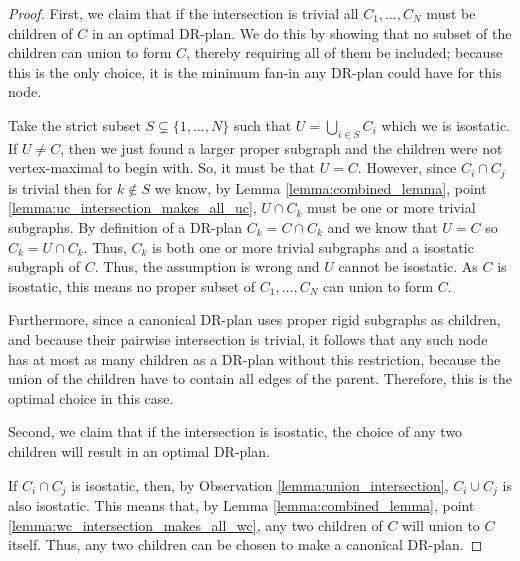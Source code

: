 \begin{proof}
\medskip\noindent
{}
%
First, we claim that if the intersection is trivial all $C_1,\ldots,C_N$ must be children of $C$ in an optimal DR-plan. We do this by showing that no subset of the children can union to form $C$, thereby requiring all of them be included; because this is the only choice, it is the minimum fan-in any DR-plan could have for this node.

Take the strict subset $S\subsetneq \{1,\ldots,N\}$ such that $U=\bigcup_{i\in S}{C_i}$ which we  is isostatic. If $U\neq C$, then we just found a larger proper subgraph and the children were not vertex-maximal to begin with. So, it must be that $U=C$.
\usestwod
However, since $C_i \cap C_j$ is trivial then for $k\notin S$ we know, by Lemma \ref{lemma:combined_lemma}, point \ref{lemma:uc_intersection_makes_all_uc}, $U\cap C_k$ must be one or more trivial subgraphs. By definition of a DR-plan $C_k=C\cap C_k$ and we know that $U=C$ so $C_k=U\cap C_k$. Thus, $C_k$ is both one or more trivial subgraphs and a isostatic subgraph of $C$. Thus, the assumption is wrong and $U$ cannot be isostatic. As $C$ is isostatic, this means no proper subset of $C_1,\ldots,C_N$ can union to form $C$.

Furthermore, since a canonical DR-plan uses proper rigid  subgraphs as children, and because their pairwise intersection is trivial, it follows that any such node has at most as many children as a DR-plan without this restriction, because the union of the children have to contain all edges of the parent. Therefore, this is the optimal choice in this case.

\medskip\noindent
{} Second, we claim that if the intersection is isostatic, the choice of any two children will result in an optimal DR-plan.

If $C_i \cap C_j$ is isostatic, then, by Observation \ref{lemma:union_intersection}, $C_i \cup C_j$ is also isostatic. This means that, by Lemma \ref{lemma:combined_lemma}, point \ref{lemma:wc_intersection_makes_all_wc}, any two children of $C$ will union to $C$ itself. Thus, any two children can be chosen to make a canonical DR-plan.

\newcommand{\induceonc}[1]{Idc\left(C,#1\right)}
\renewcommand{\induceonc}[1]{#1}
\newcommand{\iunion}[1]{\induceonc{I\cup\bigcup_{k\in S_N\setminus\{#1\}}{R_k}}}


\end{proof}
